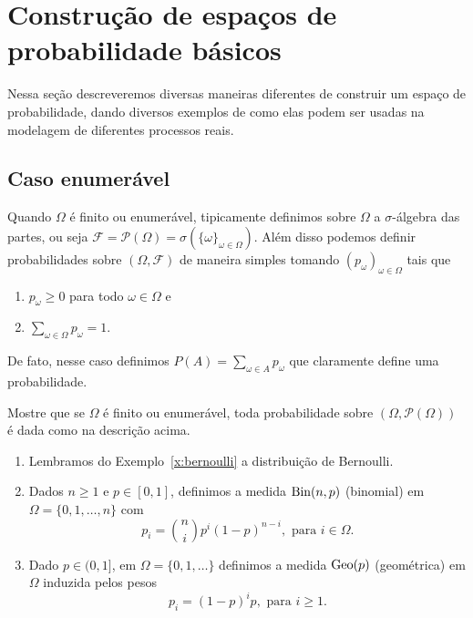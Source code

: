 

\chapter{Construção de espaços de probabilidade básicos}

Nessa seção descreveremos diversas maneiras diferentes de construir um espaço de probabilidade, dando diversos exemplos
de como elas podem ser usadas na modelagem de diferentes processos reais.

\section{Caso enumerável}

Quando $\Omega$ é finito ou enumerável, tipicamente definimos sobre $\Omega$ a $\sigma$-álgebra das partes, ou seja $\mathcal{F} = \mathcal{P}(\Omega) = \sigma(\{\omega\}_{\omega \in \Omega})$.
Além disso podemos definir probabilidades sobre $(\Omega, \mathcal{F})$ de maneira simples tomando $(p_\omega)_{\omega \in \Omega}$ tais que
\begin{enumerate}[\quad a)]
\item $p_\omega \geq 0$ para todo $\omega \in \Omega$ e
\item $\sum_{\omega \in \Omega} p_\omega = 1$.
\end{enumerate}
De fato, nesse caso definimos $P(A) = \sum_{\omega \in A} p_\omega$ que claramente define uma probabilidade.

\begin{exercise}
  Mostre que se $\Omega$ é finito ou enumerável, toda probabilidade sobre $(\Omega, \mathcal{P}(\Omega))$ é dada como na descrição acima.
\end{exercise}

\begin{example} \mbox{}
  \begin{enumerate}[\quad a)]
  \item Lembramos do Exemplo~\ref{x:bernoulli} a distribuição de Bernoulli.
  \item Dados $n \geq 1$ e $p \in [0,1]$, definimos a medida $\operatorname{Bin}(n,p)$  (binomial) em $\Omega = \{0, 1, \dots, n\}$ com
    \begin{equation}
      p_i = \binom ni p^i (1-p)^{n-i}, \text{ para $i \in \Omega$.}
    \end{equation}
  \item Dado $p \in (0,1]$, em $\Omega = \{0, 1, \dots\}$ definimos a medida $\operatorname{Geo}(p)$  (geométrica) em $\Omega$ induzida pelos pesos
  \begin{equation}
    p_i = (1-p)^i p, \text{ para $i \geq 1$.}
  \end{equation}
  \end{enumerate}
\end{example}


